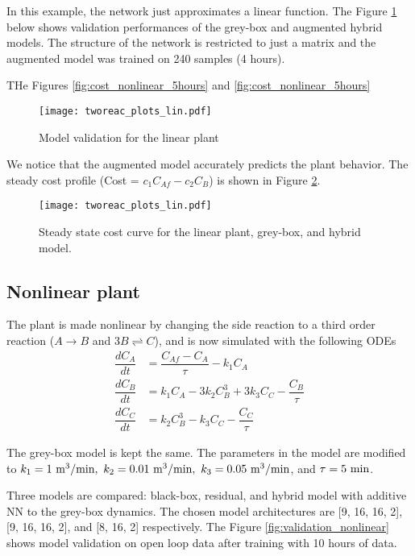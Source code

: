 \documentclass{article}
\begin{document}
In this example, the network just approximates a linear function.
The Figure \ref{fig:validation_linear} 
below shows validation performances of the grey-box 
and augmented hybrid models. The structure 
of the network is restricted to just a matrix and
the augmented model was trained on 240 samples (4 hours).

THe Figures \ref{fig:cost_nonlinear_5hours} and 
\ref{fig:cost_nonlinear_5hours} 

\begin{figure}[!h]
  \centering
  \texttt{[image: tworeac\_plots\_lin.pdf]}
  \caption{Model validation for the linear plant}
  \label{fig:validation_linear}
\end{figure}

We notice that the augmented model accurately predicts the plant 
behavior. The steady cost profile (Cost = $c_1C_{Af} - c_2C_B$)
is shown in Figure \ref{fig:cost_linear}. 

\begin{figure}[!h]
  \centering
  \texttt{[image: tworeac\_plots\_lin.pdf]}
  \caption{Steady state cost curve for 
           the linear plant, grey-box, and hybrid model.}
  \label{fig:cost_linear}
\end{figure}

\subsection{Nonlinear plant}
The plant is made nonlinear by changing the side reaction 
to a third order reaction ($A \rightarrow B $ and  $3B \rightleftharpoons C$),
and is now simulated with the following ODEs
\begin{align*}
  \dfrac{dC_A}{dt} &= \dfrac{C_{Af} - C_A}{\tau} - k_1C_A\\
  \dfrac{dC_B}{dt} &= k_1C_A - 3k_2C^3_B + 3k_3C_C- \dfrac{C_B}{\tau}\\
  \dfrac{dC_C}{dt} &= k_2C^3_B - k_3C_C - \dfrac{C_C}{\tau}
\end{align*}

The grey-box model is kept the same. The parameters 
in the model are modified to 
$k_1 = 1 \ \textnormal{m}^3/\textnormal{min}, 
\ k_2 = 0.01 \ \textnormal{m}^3/\textnormal{min},
\ k_3 = 0.05 \ \textnormal{m}^3/\textnormal{min}$, 
and $\tau = 5 \ \textnormal{min}$.

\newpage
Three models are compared: black-box, residual, and hybrid model with additive 
NN to the grey-box dynamics. The chosen model architectures 
are [9, 16, 16, 2], [9, 16, 16, 2], and [8, 16, 2] respectively.
The Figure \ref{fig:validation_nonlinear} shows model validation on open loop 
data after training with 10 hours of data.
\end{document}
